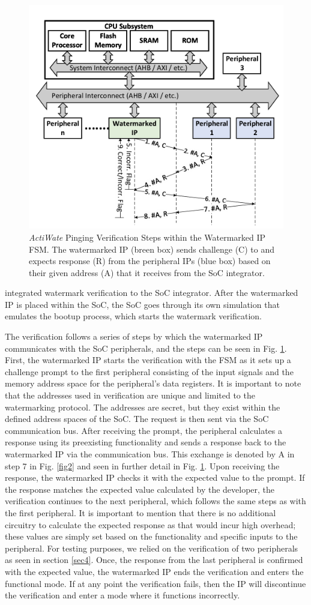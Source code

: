 \documentclass[onecolumn]{IEEEtran}
\begin{document}
\begin{figure}[H]
	\centering
	\includegraphics[width=0.5\columnwidth]{fig3.png}
	\caption{ \textit{ActiWate} Pinging Verification Steps within the Watermarked IP FSM.
		The watermarked IP (breen box) sends challenge (C) to and expects response
		(R) from the peripheral IPs (blue box) based on their given address (A) that
		it receives from the SoC integrator.}
	\captionsetup{justification=centering}
	\label{fig3}
\end{figure}

integrated watermark verification to the SoC integrator. After the
watermarked IP is placed within the SoC, the SoC goes through its
own simulation that emulates the bootup process, which starts the
watermark verification.

The verification follows a series of steps by which the watermarked
IP communicates with the SoC peripherals, and the steps can be seen
in Fig. \ref{fig3}. First, the watermarked IP starts the verification with the
FSM as it sets up a challenge prompt to the first peripheral consisting
of the input signals and the memory address space for the peripheral’s
data registers. It is important to note that the addresses used in
verification are unique and limited to the watermarking protocol. The
addresses are secret, but they exist within the defined address spaces
of the SoC. The request is then sent via the SoC communication
bus. After receiving the prompt, the peripheral calculates a response
using its preexisting functionality and sends a response back to
the watermarked IP via the communication bus. This exchange is
denoted by A in step 7 in Fig. \ref{fig2} and seen in further detail in
Fig. \ref{fig3}. Upon receiving the response, the watermarked IP checks
it with the expected value to the prompt. If the response matches
the expected value calculated by the developer, the verification
continues to the next peripheral, which follows the same steps as
with the first peripheral. It is important to mention that there is
no additional circuitry to calculate the expected response as that
would incur high overhead; these values are simply set based on
the functionality and specific inputs to the peripheral. For testing
purposes, we relied on the verification of two peripherals as seen in
section \ref{sec4}. Once, the response from the last peripheral is confirmed
with the expected value, the watermarked IP ends the verification and
enters the functional mode. If at any point the verification fails, then
the IP will discontinue the verification and enter a mode where it
functions incorrectly.
\end{document}
